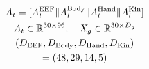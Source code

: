 \documentclass[border=7pt,varwidth=108mm]{standalone}
\begin{document}
\color{ink}\fontsize{15}{23}\selectfont
\[
\begin{gathered} A_t=[A_t^{\rm EEF}\Vert A_t^{\rm Body}\Vert A_t^{\rm Hand}\Vert A_t^{\rm Kin}]\\ A_t\in\mathbb R^{30\times96},\quad X_g\in\mathbb R^{30\times D_g}\\ (D_{\rm EEF},D_{\rm Body},D_{\rm Hand},D_{\rm Kin})\\ =(48,29,14,5)\end{gathered}
\]
\end{document}
